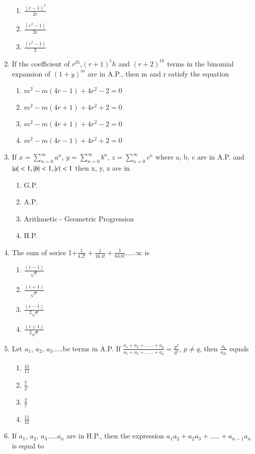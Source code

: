 \begin{enumerate}[label=\arabic*.,ref=\thesubsection.\theenumi]
\begin{enumerate}
\item $\frac{(e-1)^2}{2e}$
\item $\frac{(e^2-1)}{2e}$
\item $\frac{(e^2-1)}{2}$
\end{enumerate}
\item If the coefficient of $r^{th}$,$(r+1)^th$ and $(r+2)^{th}$ terms in the binomial expansion of $(1+y)^m$ are in A.P., then m and r satisfy the equation
\begin{enumerate}
\item $m^2 - m(4r-1) + 4r^2 - 2 = 0$
\item $m^2 - m(4r+1) + 4r^2 + 2 = 0$
\item $m^2 - m(4r+1) + 4r^2 - 2 = 0$
\item $m^2 - m(4r-1) + 4r^2 + 2 = 0$
\end{enumerate}
\item If $x=\sum_{n=0}^{\infty}a^n$,  $y=\sum_{n=0}^{\infty}b^n$,  $z=\sum_{n=0}^{\infty}c^n$ where a, b, c are in A.P. and $\left\vert a\right\vert<1,\left\vert b\right\vert<1,\left\vert c\right\vert<1$ then x, y, z are in
\begin{enumerate}
\item G.P.
\item A.P.
\item Arithmetic - Geometric Progression
\item H.P.
\end{enumerate}
\item The sum of series 1+$\frac{1}{4.2!}+\frac{1}{16.4!}+\frac{1}{64.6!}.....\infty$ is 
\begin{enumerate}
\item $\frac{(e - 1)}{\sqrt{e}}$
\item $\frac{(e + 1)}{\sqrt{e}}$
\item $\frac{(e - 1)}{2\sqrt{e}}$
\item $\frac{(e + 1)}{2\sqrt{e}}$
\end{enumerate}
\item Let $a_1$, $a_2$, $a_3$.....be terms in A.P. If $\frac{a_1+a_2+......+a_p}{a_1+a_2+......+a_q} = \frac{p^2}{q^2}$, $p\neq q$, then $\frac{a_6}{a_{21}}$ equals 
\begin{enumerate}
\item $\frac{41}{11}$
\item $\frac{7}{2}$.
\item $\frac{2}{7}$
\item $\frac{11}{41}$
\end{enumerate}
\item If $a_1$, $a_2$, $a_3$.....$a_n$ are in H.P., then the expression $a_1a_2+a_2a_3+.....+a_{n-1}a_n$ is equal to

\end{enumerate}
